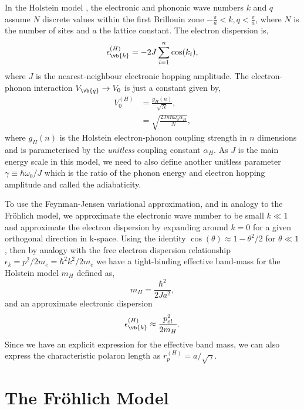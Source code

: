 In the Holstein model \cite{HolsteinI1959, HolsteinII1959}, the electronic and phononic wave numbers $k$ and $q$ assume $N$ discrete values within the first Brillouin zone $-\frac{\pi}{a} < k, q < \frac{\pi}{a}$, where $N$ is the number of sites and $a$ the lattice constant. The electron dispersion is,
\begin{equation}
    \epsilon^{(H)}_{\vb{k}} = -2 J \sum_{i=1}^n \cos(k_i) ,
\end{equation}
where $J$ is the nearest-neighbour electronic hopping amplitude. The electron-phonon interaction $V_{\vb{q}} \to V_0$ is just a constant given by,
\begin{equation}
    \begin{aligned}
        V^{(H)}_{0} &= \frac{g_{H}(n)}{\sqrt{N}} , \\
        &= \sqrt{\frac{2 J n \hbar \omega_0 \alpha_H}{N}} ,
    \end{aligned}
\end{equation}
where $g_{H}(n)$ is the Holstein electron-phonon coupling strength in $n$ dimensions and is parameterised by the \emph{unitless} coupling constant $\alpha_H$. As $J$ is the main energy scale in this model, we need to also define another unitless parameter $\gamma \equiv \hbar \omega_0 / J$ which is the ratio of the phonon energy and electron hopping amplitude and called the adiabaticity.
\newline

To use the Feynman-Jensen variational approximation, and in analogy to the Fr\"ohlich model, we approximate the electronic wave number to be small $k \ll 1$ and approximate the electron dispersion by expanding around $k = 0$ for a given orthogonal direction in k-space. Using the identity $\cos(\theta) \approx 1 - \theta^2 / 2 $ for $\theta \ll 1$, then by analogy with the free electron dispersion relationship $\epsilon_k = p^2 / 2 m_e = \hbar^2 k^2 / 2 m_e$ we have a tight-binding effective band-mass for the Holstein model $m_H$ defined as,
\begin{equation}
    m_H = \frac{\hbar^2}{2 J a^2} ,
\end{equation}
and an approximate electronic dispersion
\begin{equation}
    \epsilon^{(H)}_{\vb{k}} \approx \frac{p^2_{el}}{2 m_H}.
\end{equation}
Since we have an explicit expression for the effective band mass, we can also express the characteristic polaron length as $r^{(H)}_p = a / \sqrt{\gamma}$.

\section{The Fr\"ohlich Model}
\label{sec:chap-fourth-first}

